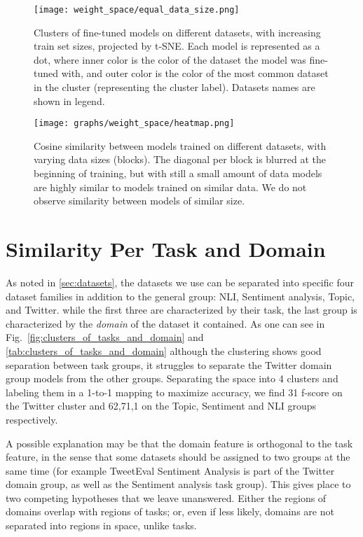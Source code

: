 \documentclass[nohyperref]{article}
\theoremstyle{plain}
\theoremstyle{definition}
\theoremstyle{remark}
\begin{document}
\begin{figure}[tbhp]
\texttt{[image: weight\_space/equal\_data\_size.png]}
\caption{Clusters of fine-tuned models on different datasets, with increasing train set sizes, projected by t-SNE. %
Each model is represented as a dot, where inner color is the color of the dataset the model was fine-tuned with, and outer color is the color of the most common dataset in the cluster (representing the cluster label). Datasets names are shown in legend. }
\label{fig:equal_data_size}
\end{figure}


\begin{figure*}[t]
\texttt{[image: graphs/weight\_space/heatmap.png]}
    \label{fig:cosine_similarities_across_sizes}
    \caption{Cosine similarity between models trained on different datasets, with varying data sizes (blocks). The diagonal per block is blurred at the beginning of training, but with still a small amount of data models are highly similar to models trained on similar data. We do not observe similarity between models of similar size. }
\end{figure*}



\section{Similarity Per Task and Domain}\label{ap:sec:sim_per_task_and_domain}
As noted in \ref{sec:datasets}, the datasets we use can be separated into specific four dataset families in addition to the general group: NLI, Sentiment analysis, Topic, and Twitter. while the first three are characterized by their task, the last group is characterized by the \emph{domain} of the dataset it contained. As one  can see in Fig.~\ref{fig:clusters_of_tasks_and_domain} and \ref{tab:clusters_of_tasks_and_domain} although the clustering shows good separation between task groups, it struggles to separate the Twitter domain group models from the other groups. Separating the space into 4 clusters and labeling them in a 1-to-1 mapping to maximize accuracy, we find 31 f-score on the Twitter cluster and 62,71,1 on the Topic, Sentiment and NLI groups respectively. 

A possible explanation may be that the domain feature is orthogonal to the task feature, in the sense that some datasets should be assigned to two groups at the same time (for example  TweetEval Sentiment Analysis \citep{rosenthal-etal-2017-semeval} is part of the Twitter domain group, as well as the Sentiment analysis task group). 
This gives place to two competing hypotheses that we leave unanswered. Either the regions of domains overlap with regions of tasks; or, even if less likely, domains are not separated into regions in space, unlike tasks. 
\end{document}
